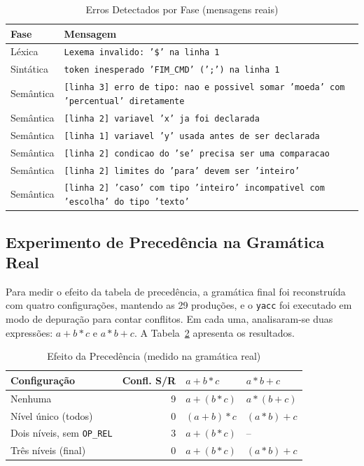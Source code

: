 \documentclass[conference]{IEEEtran}
\begin{document}
\begin{table}[!htbp]
\caption{Erros Detectados por Fase (mensagens reais)}
\label{tab:erros}
\centering
\footnotesize
\begin{tabular}{@{}p{}p{}@{}}
\toprule
\textbf{Fase} & \textbf{Mensagem} \\
\midrule
Léxica & \texttt{Lexema invalido: '\$' na linha 1} \\
Sintática & \texttt{token inesperado 'FIM\_CMD' (';') na linha 1} \\
Semântica & \texttt{[linha 3] erro de tipo: nao e possivel somar 'moeda' com 'percentual' diretamente} \\
Semântica & \texttt{[linha 2] variavel 'x' ja foi declarada} \\
Semântica & \texttt{[linha 1] variavel 'y' usada antes de ser declarada} \\
Semântica & \texttt{[linha 2] condicao do 'se' precisa ser uma comparacao} \\
Semântica & \texttt{[linha 2] limites do 'para' devem ser 'inteiro'} \\
Semântica & \texttt{[linha 2] 'caso' com tipo 'inteiro' incompativel com 'escolha' do tipo 'texto'} \\
\bottomrule
\end{tabular}
\end{table}

\subsection{Experimento de Precedência na Gramática Real}
\label{sec:precexp}

Para medir o efeito da tabela de precedência, a gramática final foi reconstruída com quatro configurações, mantendo as 29 produções, e o \texttt{yacc} foi executado em modo de depuração para contar conflitos. Em cada uma, analisaram-se duas expressões: $a + b * c$ e $a * b + c$. A Tabela~\ref{tab:prec} apresenta os resultados.

\begin{table}[!htbp]
\caption{Efeito da Precedência (medido na gramática real)}
\label{tab:prec}
\centering
\footnotesize
\setlength{\tabcolsep}{3pt}\begin{tabular}{@{}p{}rp{}p{}@{}}
\toprule
\textbf{Configuração} & \textbf{Confl. S/R} & $a+b*c$ & $a*b+c$ \\
\midrule
Nenhuma & 9 & $a+(b*c)$ & $a*(b+c)$ \\
Nível único (todos) & 0 & $(a+b)*c$ & $(a*b)+c$ \\
Dois níveis, sem \texttt{OP\_REL} & 3 & $a+(b*c)$ & -- \\
Três níveis (final) & 0 & $a+(b*c)$ & $(a*b)+c$ \\
\bottomrule
\end{tabular}
\end{table}
\end{document}
